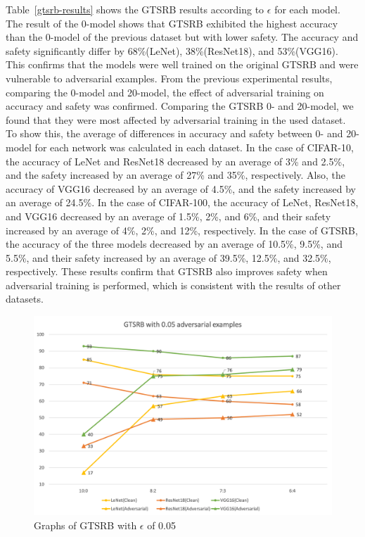 \documentclass[journal,article,submit,moreauthors,pdftex]{Definitions/mdpi}
\begin{document}
Table~\ref{gtsrb-results} shows the GTSRB results according to \begin{math}\epsilon\end{math} for each model.
The result of the 0-model shows that GTSRB exhibited the highest accuracy than the 0-model of the previous dataset but with lower safety.
The accuracy and safety significantly differ by 68\%(LeNet), 38\%(ResNet18), and 53\%(VGG16).
This confirms that the models were well trained on the original GTSRB and were vulnerable to adversarial examples.
From the previous experimental results, comparing the 0-model and 20-model, the effect of adversarial training on accuracy and safety was confirmed.
Comparing the GTSRB 0- and 20-model, we found that they were most affected by adversarial training in the used dataset.
To show this, the average of differences in accuracy and safety between 0- and 20-model for each network was calculated in each dataset.
In the case of CIFAR-10, the accuracy of LeNet and ResNet18 decreased by an average of 3\% and 2.5\%, and the safety increased by an average of 27\% and 35\%, respectively.
Also, the accuracy of VGG16 decreased by an average of 4.5\%, and the safety increased by an average of 24.5\%.
In the case of CIFAR-100, the accuracy of LeNet, ResNet18, and VGG16 decreased by an average of 1.5\%, 2\%, and 6\%, and their safety increased by an average of 4\%, 2\%, and 12\%, respectively.
In the case of GTSRB, the accuracy of the three models decreased by an average of 10.5\%, 9.5\%, and 5.5\%, and their safety increased by an average of 39.5\%, 12.5\%, and 32.5\%, respectively.
These results confirm that GTSRB also improves safety when adversarial training is performed, which is consistent with the results of other datasets.

\begin{figure}[H]
    \includegraphics[width=13 cm]{Definitions/graph-005gtsrb.png}
    \caption{Graphs of GTSRB with \begin{math}\epsilon\end{math} of 0.05\label{gtsrb-0.05-graph}}
\end{figure} 
\end{document}
